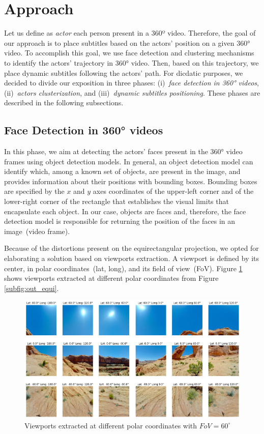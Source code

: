 \section{Approach}
\label{sec:approach}
Let us define as \emph{actor} each person present in a 360º video. Therefore, the goal of our approach is to place subtitles based on the actors' position on a given 360° video. To accomplish this goal, we use face detection and clustering mechanisms to identify the actors' trajectory in 360° video. Then, based on this trajectory, we place dynamic subtitles following the actors' path. For dicdatic purposes, we decided to divide our exposition in three phases: (i)~\emph{face detection in 360° videos}, (ii)~\emph{actors clusterization}, and (iii)~\emph{dynamic subtitles positioning}. These phases are described in the following subsections. 

\subsection{Face Detection in 360° videos}

In this phase, we aim at detecting the actors' faces present in the 360° video frames using object detection models.
In general, an object detection model can identify which, among a known set of objects, are present in the image, and provides information about their positions with bounding boxes.
Bounding boxes are specified by the $x$ and $y$ axes coordinates of the upper-left corner and of the lower-right corner of the rectangle that establishes the visual limits that encapsulate each object.
In our case, objects are faces and, therefore, the face detection model is responsible for returning the position of the faces in an image~(video frame).

Because of the distortions present on the equirectangular projection, we opted for elaborating a solution based on viewports extraction. A viewport is defined by its center, in polar coordinates~(lat, long), and its field of view~(FoV). Figure \ref{fig:viewports} shows viewports extracted at different polar coordinates from Figure \ref{subfig:out_equi}.

\begin{figure}[!ht]
    \centering
    \includegraphics[width=1\textwidth]{img/viewports.png}
    \caption{Viewports extracted at different polar coordinates with $FoV = 60^{\circ}$}
    \label{fig:viewports}
\end{figure}

